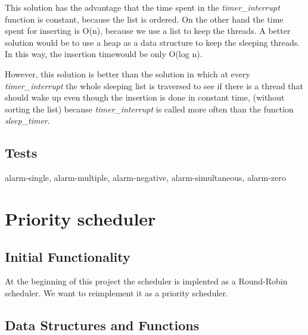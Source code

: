 	This solution has the advantage that the time spent in the \textit{timer\_interrupt} function is constant, because the list is ordered. On the other hand the time spent for inserting is O(n), because we use a list to keep the threads. A better solution would be to use a heap as a data structure to keep the sleeping threads. In this way, the insertion timewould be only O(log n). 

	However, this solution is better than the solution in which at every \textit{timer\_interrupt} the whole sleeping list is traversed to see if there is a thread that should wake up even though the insertion is done in constant time, (without sorting the list) because \textit{timer\_interrupt} is called more often than the function \textit{sleep\_timer}.

    \subsection{Tests}

    alarm-single, alarm-multiple, alarm-negative, alarm-simultaneous, alarm-zero



\section{Priority scheduler}

    \subsection{Initial Functionality}

	At the beginning of this project the scheduler is implented as a Round-Robin scheduler. We want to reimplement it as a priority scheduler.

    \subsection{Data Structures and Functions}

